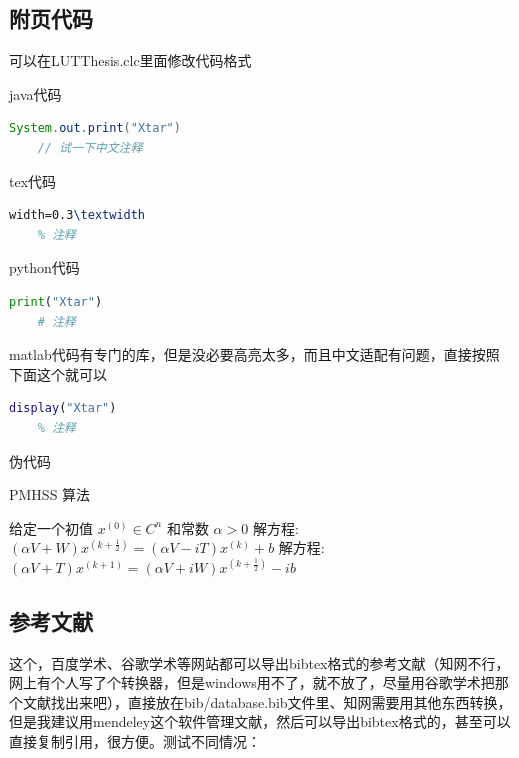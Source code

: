 \documentclass[AutoFakeBold]{LUTThesis}
\begin{document}
\subsection{附页代码} %
\label{sub:附页代码}
可以在LUTThesis.clc里面修改代码格式

java代码
\begin{lstlisting}[language = java]
    System.out.print("Xtar")
    // 试一下中文注释
\end{lstlisting}


tex代码
\begin{lstlisting}[language = tex]
    width=0.3\textwidth
    % 注释
\end{lstlisting}

python代码
\begin{lstlisting}[language = python]
    print("Xtar")
    # 注释
\end{lstlisting}

matlab代码有专门的库，但是没必要高亮太多，而且中文适配有问题，直接按照下面这个就可以
\begin{lstlisting}[language = matlab]
    display("Xtar")
    % 注释
\end{lstlisting}


伪代码

\begin{algorithm}[H]
    \caption{PMHSS 算法\label{Alg:PMHSS}}
    \begin{algorithmic}[1]
        \State 给定一个初值 $ x^{(0)} \in C^{n} $  和常数 $\alpha>0$
        \State 解方程: $(\alpha V+W)x^{(k+\frac{1}{2})}=(\alpha V-i T)x^{(k)}+b $
        \State 解方程: $(\alpha V+T)x^{(k+1)}=(\alpha V+i W)x^{(k+\frac{1}{2})}-i b$
        \EndFor
    \end{algorithmic}
\end{algorithm}

\subsection{参考文献} %
\label{sub:参考文献}

这个，百度学术、谷歌学术等网站都可以导出bibtex格式的参考文献（知网不行，网上有个人写了个转换器，但是windows用不了，就不放了，尽量用谷歌学术把那个文献找出来吧），直接放在bib/database.bib文件里、知网需要用其他东西转换，但是我建议用mendeley这个软件管理文献，然后可以导出bibtex格式的，甚至可以直接复制引用，很方便\cite{partl2016, tenne1992polyhedral, tussyadiah2015hotels}。测试不同情况：
\end{document}
